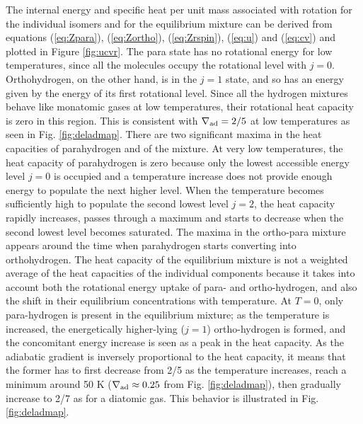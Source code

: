 \documentclass[apj]{emulateapj}
\newcommand{\delad}{\nabla_{\rm ad}}
\begin{document}
The internal energy and specific heat per unit mass associated with rotation for the individual isomers and for the equilibrium mixture can be derived from equations (\ref{eq:Zpara}), (\ref{eq:Zortho}), (\ref{eq:Zrspin}), (\ref{eq:u}) and (\ref{eq:cv}) and plotted in Figure \ref{fig:ucvr}. The para state has no rotational energy for low temperatures, since all the molecules occupy the rotational level with $j=0$. Orthohydrogen, on the other hand, is in the $j=1$ state, and so has an energy given by the energy of its first rotational level. Since all the hydrogen mixtures behave like monatomic gases at low temperatures, their rotational heat capacity is zero in this region. This is consistent with $\delad=2/5$ at low temperatures as seen in Fig. \ref{fig:deladmap}. There are two significant maxima in the heat capacities of parahydrogen and of the mixture. At very low temperatures, the heat capacity of parahydrogen is zero because only the lowest accessible energy level $j=0$ is occupied and a temperature increase does not provide enough energy to populate the next higher level. When the temperature becomes sufficiently high to populate the second lowest level $j=2$, the heat capacity rapidly increases, passes through a maximum and starts to decrease when the second lowest level becomes saturated. The maxima in the ortho-para mixture appears around the time when parahydrogen starts converting into orthohydrogen. The heat capacity of the equilibrium mixture is not a weighted average of the heat capacities of the individual components because it takes into account both the rotational energy uptake of para- and ortho-hydrogen, and also the shift in their equilibrium concentrations with temperature. At $T=0$, only para-hydrogen is present in the equilibrium mixture; as the temperature is increased, the energetically higher-lying ($j=1$) ortho-hydrogen is formed, and the concomitant energy increase is seen as a peak in the heat capacity. As the adiabatic gradient is inversely proportional to the heat capacity, it means that  the former has to first decrease from 2/5 as the temperature increases, reach a minimum around 50 K ($\delad \approx 0.25$ from Fig. \ref{fig:deladmap}), then gradually increase to 2/7 as for a diatomic gas. This behavior is illustrated in Fig. \ref{fig:deladmap}.  
\end{document}
